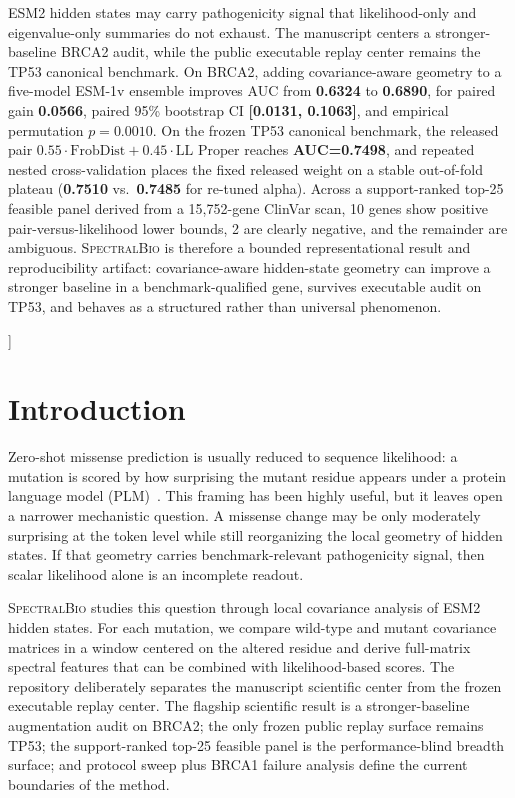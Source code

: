 \documentclass[10pt,twocolumn,letterpaper]{article}
\newcommand{\methodname}{\textsc{SpectralBio}}
\begin{document}
{\begin{center}
{ESM2 hidden states may carry pathogenicity signal that likelihood-only and
eigenvalue-only summaries do not exhaust. The manuscript centers a stronger-baseline
BRCA2 audit, while the public executable replay center remains the TP53 canonical
benchmark. On BRCA2, adding covariance-aware geometry to a five-model ESM-1v
ensemble improves AUC from \textbf{0.6324} to \textbf{0.6890}, for paired gain
\textbf{0.0566}, paired 95\% bootstrap CI \textbf{[0.0131, 0.1063]}, and
empirical permutation \textbf{$p=0.0010$}. On the frozen TP53 canonical benchmark,
the released pair \textbf{$0.55\cdot\text{FrobDist}+0.45\cdot\text{LL Proper}$}
reaches \textbf{AUC=0.7498}, and repeated nested cross-validation places the fixed
released weight on a stable out-of-fold plateau (\textbf{0.7510} vs.\ \textbf{0.7485}
for re-tuned alpha). Across a support-ranked top-25 feasible panel derived from a
15,752-gene ClinVar scan, 10 genes show positive pair-versus-likelihood lower bounds,
2 are clearly negative, and the remainder are ambiguous. \methodname{} is therefore a
bounded representational result and reproducibility artifact: covariance-aware
hidden-state geometry can improve a stronger baseline in a benchmark-qualified gene,
survives executable audit on TP53, and behaves as a structured rather than universal
phenomenon.%
}
\end{center}
\vspace{4pt}%
}]%

\section{Introduction}

Zero-shot missense prediction is usually reduced to sequence likelihood:
a mutation is scored by how surprising the mutant residue appears under a protein
language model (PLM)~\cite{meier2021language}. This framing has been highly useful,
but it leaves open a narrower mechanistic question. A missense change may be only
moderately surprising at the token level while still reorganizing the local geometry
of hidden states. If that geometry carries benchmark-relevant pathogenicity signal,
then scalar likelihood alone is an incomplete readout.

\methodname{} studies this question through local covariance analysis of ESM2 hidden
states. For each mutation, we compare wild-type and mutant covariance matrices in a
window centered on the altered residue and derive full-matrix spectral features that
can be combined with likelihood-based scores. The repository deliberately separates
the manuscript scientific center from the frozen executable replay center. The
flagship scientific result is a stronger-baseline augmentation audit on BRCA2; the
only frozen public replay surface remains TP53; the support-ranked top-25 feasible
panel is the performance-blind breadth surface; and protocol sweep plus BRCA1 failure
analysis define the current boundaries of the method.
\end{document}

